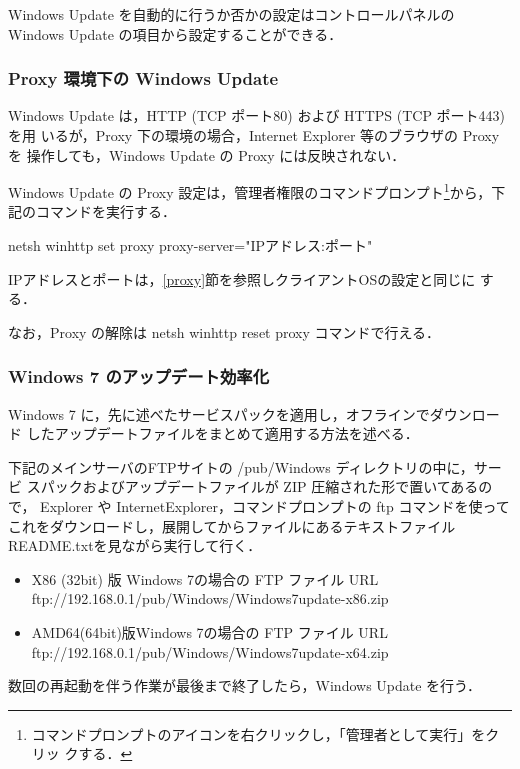 Windows Update を自動的に行うか否かの設定はコントロールパネルの Windows
Update の項目から設定することができる．

\subsubsection*{Proxy 環境下の Windows Update}

Windows Update は，HTTP (TCP ポート80) および HTTPS (TCP ポート443) を用
いるが，Proxy 下の環境の場合，Internet Explorer 等のブラウザの Proxy を
操作しても，Windows Update の Proxy には反映されない．

Windows Update の Proxy 設定は，管理者権限のコマンドプロンプト\footnote
{コマンドプロンプトのアイコンを右クリックし，「管理者として実行」をクリッ
クする．}から，下記のコマンドを実行する．
\begin{cli}
netsh winhttp set proxy proxy-server="IPアドレス:ポート"
\end{cli}
IPアドレスとポートは，\ref{proxy}節を参照しクライアントOSの設定と同じに
する．

なお，Proxy の解除は netsh winhttp reset proxy コマンドで行える．

\subsubsection*{Windows 7 のアップデート効率化}

Windows 7 に，先に述べたサービスパックを適用し，オフラインでダウンロード
したアップデートファイルをまとめて適用する方法を述べる．

下記のメインサーバのFTPサイトの /pub/Windows ディレクトリの中に，サービ
スパックおよびアップデートファイルが ZIP 圧縮された形で置いてあるので，
Explorer や InternetExplorer，コマンドプロンプトの ftp コマンドを使って
これをダウンロードし，展開してからファイルにあるテキストファイル
README.txtを見ながら実行して行く．

\begin{itemize}
 \item X86 (32bit) 版 Windows 7の場合の FTP ファイル URL\\
 ftp://192.168.0.1/pub/Windows/Windows7update-x86.zip
 \item AMD64(64bit)版Windows 7の場合の FTP ファイル URL\\
 ftp://192.168.0.1/pub/Windows/Windows7update-x64.zip
\end{itemize}

数回の再起動を伴う作業が最後まで終了したら，Windows Update を行う．


